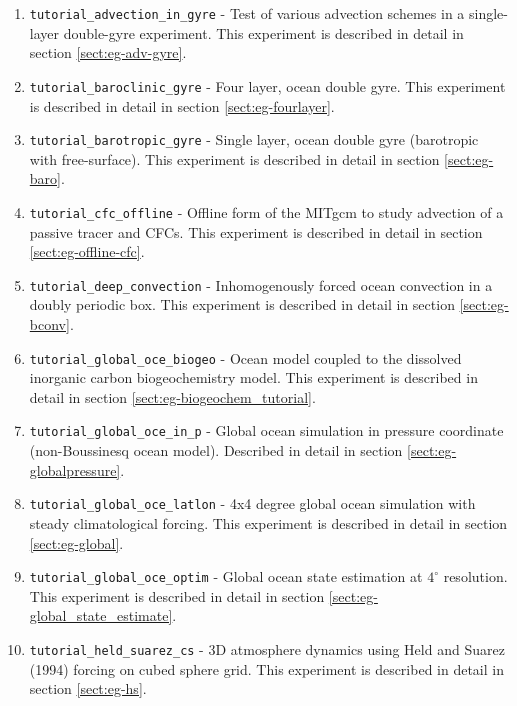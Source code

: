 \begin{enumerate}
  
\item \texttt{tutorial\_advection\_in\_gyre} - Test of various
  advection schemes in a single-layer double-gyre experiment.
  This experiment is described in detail in section
  \ref{sect:eg-adv-gyre}.

\item \texttt{tutorial\_baroclinic\_gyre} - Four layer, ocean double
  gyre. This experiment is described in detail in section
  \ref{sect:eg-fourlayer}.

\item \texttt{tutorial\_barotropic\_gyre} - Single layer, ocean double
  gyre (barotropic with free-surface). 
  This experiment is described in detail in section \ref{sect:eg-baro}.

\item \texttt{tutorial\_cfc\_offline} - Offline form of the MITgcm to
  study advection of a passive tracer and CFCs.
  This experiment is described in detail in section \ref{sect:eg-offline-cfc}.

\item \texttt{tutorial\_deep\_convection} - Inhomogenously forced
  ocean convection in a doubly periodic box. This experiment is
  described in detail in section \ref{sect:eg-bconv}.

\item \texttt{tutorial\_global\_oce\_biogeo} - Ocean model coupled to
  the dissolved inorganic carbon biogeochemistry model. This
  experiment is described in detail in section
  \ref{sect:eg-biogeochem_tutorial}.

\item \texttt{tutorial\_global\_oce\_in\_p} - Global ocean simulation in
  pressure coordinate (non-Boussinesq ocean model). Described in
  detail in section \ref{sect:eg-globalpressure}.

\item \texttt{tutorial\_global\_oce\_latlon} - 4x4 degree global ocean
  simulation with steady climatological forcing. This experiment is
  described in detail in section \ref{sect:eg-global}.

\item \texttt{tutorial\_global\_oce\_optim} - Global ocean state
  estimation at $4^\circ$ resolution.  This experiment is described in
  detail in section \ref{sect:eg-global_state_estimate}.

\item \texttt{tutorial\_held\_suarez\_cs} - 3D atmosphere dynamics
  using Held and Suarez (1994) forcing on cubed sphere grid.  This
  experiment is described in detail in section \ref{sect:eg-hs}.
  

\end{enumerate}
